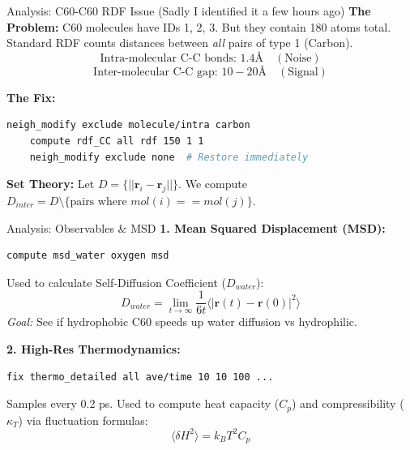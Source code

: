\documentclass[aspectratio=169, 10pt]{beamer}
\begin{document}
\begin{frame}[fragile]{Analysis: C60-C60 RDF Issue (Sadly I identified it a few hours ago)}
    \textbf{The Problem:} 
    C60 molecules have IDs 1, 2, 3. But they contain 180 atoms total.
    Standard RDF counts distances between \textit{all} pairs of type 1 (Carbon).
    \[ \text{Intra-molecular C-C bonds: } 1.4 \text{\AA} \quad (\text{Noise}) \]
    \[ \text{Inter-molecular C-C gap: } 10-20 \text{\AA} \quad (\text{Signal}) \]

    \textbf{The Fix:}
    \begin{lstlisting}[language=bash]
    neigh_modify exclude molecule/intra carbon
    compute rdf_CC all rdf 150 1 1
    neigh_modify exclude none  # Restore immediately
    \end{lstlisting}
    
    \textbf{Set Theory:}
    Let $D = \{ ||\mathbf{r}_i - \mathbf{r}_j|| \}$.
    We compute $D_{inter} = D \setminus \{ \text{pairs where } mol(i) == mol(j) \}$.
\end{frame}

\begin{frame}[fragile]{Analysis: Observables \& MSD}
    \textbf{1. Mean Squared Displacement (MSD):}
    \begin{lstlisting}[language=bash]
    compute msd_water oxygen msd
    \end{lstlisting}
    Used to calculate Self-Diffusion Coefficient ($D_{water}$):
    \begin{equation}
        D_{water} = \lim_{t \to \infty} \frac{1}{6t} \langle |\mathbf{r}(t) - \mathbf{r}(0)|^2 \rangle
    \end{equation}
    \textit{Goal:} See if hydrophobic C60 speeds up water diffusion vs hydrophilic.

    \textbf{2. High-Res Thermodynamics:}
    \begin{lstlisting}[language=bash]
    fix thermo_detailed all ave/time 10 10 100 ...
    \end{lstlisting}
    Samples every 0.2 ps. Used to compute heat capacity ($C_p$) and compressibility ($\kappa_T$) via fluctuation formulas:
    \begin{equation}
        \langle \delta H^2 \rangle = k_B T^2 C_p
    \end{equation}
\end{frame}

\end{document}
